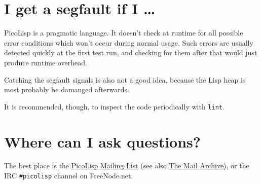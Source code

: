  
\section{I get a segfault if I \ldots{}}
\label{sec:faq-i-get-a-segfault-if-i}


PicoLisp is a pragmatic language. It doesn't check at runtime for all
possible error conditions which won't occur during normal usage. Such
errors are usually detected quickly at the first test run, and checking
for them after that would just produce runtime overhead.

Catching the segfault signals is also not a good idea, because the Lisp
heap is most probably be damanged afterwards.

It is recommended, though, to inspect the code periodically with \texttt{lint}.

  
\section{Where can I ask questions?}
\label{sec:faq-where-can-i-ask-questions?}


The best place is the
\href{mailto:picolisp@software-lab.de?subject=Subscribe}{PicoLisp Mailing List} (see also
\href{http://www.mail-archive.com/picolisp@software-lab.de/}{The Mail Archive}), or the IRC \texttt{\#picolisp}
channel on FreeNode.net.

